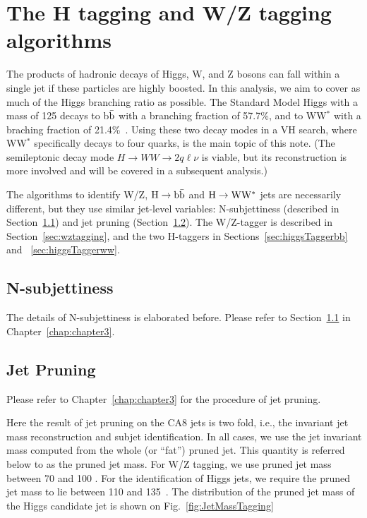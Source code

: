 \section{The H tagging and W/Z tagging algorithms}
\label{sec: H tagging}

The products of hadronic decays of Higgs, W, and Z bosons can fall
within a single jet if these particles are highly boosted.  In this
analysis, we aim to cover as much of the Higgs branching ratio as
possible.  The Standard Model Higgs with a mass of 125 \GeVcc decays
to b$\bar{\rm b}$ with a branching fraction of 57.7\%, and to WW$^*$
with a braching fraction of 21.4\%~\cite{pdg-higgs}.  Using these two
decay modes in a VH search, where WW$^*$ specifically decays to four
quarks, is the main topic of this note.  (The semileptonic decay mode
$ H \to WW \to 2q\ell \nu$ is viable, but its reconstruction is more
involved and will be covered in a subsequent analysis.)



The algorithms to identify W/Z, ${\rm H \to b\bar{b}}$ and 
${\rm H \to WW^*}$ jets are necessarily different, but they use similar
jet-level variables: N-subjettiness (described in
Section~\ref{sec:N-subjettiness}) and jet pruning
(Section~\ref{sec:jetPruning}).  The W/Z-tagger is described in
Section~\ref{sec:wztagging}, and the two H-taggers in
Sections~\ref{sec:higgsTaggerbb} and ~\ref{sec:higgsTaggerww}.



\subsection{N-subjettiness}
\label{sec:N-subjettiness}

The details of N-subjettiness is elaborated before. Please refer to 
Section~\ref{sec:N-subjettiness} in Chapter~\ref{chap:chapter3}. 



\subsection{Jet Pruning}
\label{sec:jetPruning}

Please refer to Chapter~\ref{chap:chapter3} for the procedure of jet pruning. 

Here the result of jet pruning on the CA8 jets is two fold, i.e., the invariant jet mass 
reconstruction and subjet identification.
In all cases,
we use the jet invariant mass computed from the whole (or ``fat'') 
pruned jet.  This quantity is referred below to as the pruned jet mass.
For W/Z tagging, we use pruned jet mass between 70 and 100 \GeVcc. 
For the identification of Higgs jets, we require the pruned jet mass to
lie between 110 and 135~\GeVcc.  The distribution of the pruned jet
mass of the Higgs candidate jet is shown on Fig.~\ref{fig:JetMassTagging} 


